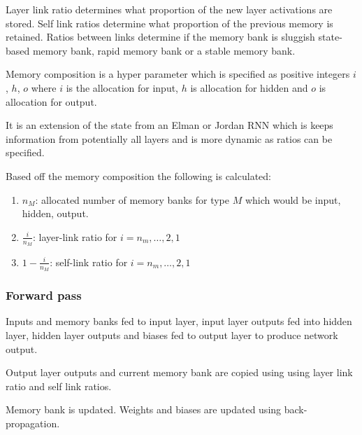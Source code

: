 \documentclass[conference]{IEEEtran}
\begin{document}
Layer link ratio determines what proportion of the new layer activations are stored. Self link ratios determine what proportion of the previous memory is retained. Ratios between links determine if the memory bank is sluggish state-based memory bank, rapid memory bank or a stable memory bank.

Memory composition is a hyper parameter which is specified as positive integers $i$, $h$, $o$ where $i$ is the allocation for input, $h$ is allocation for hidden and $o$ is allocation for output.

It is an extension of the state from an Elman or Jordan RNN which is keeps information from potentially all layers and is more dynamic as ratios can be specified.

Based off the memory composition the following is calculated:

\begin{enumerate}
	\item $n_M$: allocated number of memory banks for type $M$ which would be input, hidden, output.
	\item $\frac{i}{n_M}$: layer-link ratio for $i=n_m, \dots, 2, 1$
	\item $1 - \frac{i}{n_M}$: self-link ratio for $i=n_m, \dots, 2, 1$
\end{enumerate}





\subsubsection{Forward pass}

Inputs and memory banks fed to input layer, input layer outputs fed into hidden layer, hidden layer outputs and biases fed to output layer to produce network output.

Output layer outputs and current memory bank are copied using using layer link ratio and self link ratios.

Memory bank is updated. Weights and biases are updated using back-propagation.
\end{document}
